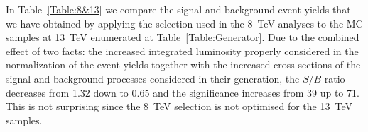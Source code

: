 

In Table~\ref{Table:8&13} we compare the signal and background event yields that we have obtained by applying the selection used in the 8~TeV analyses to the MC samples at 13~TeV enumerated at Table~\ref{Table:Generator}.
Due to the combined effect of two facts: the increased integrated luminosity
properly considered in the normalization of the event yields together with the increased cross sections of the signal and background processes considered in their generation, the $S/B$ ratio decreases from 1.32 down to 0.65 and the significance increases from 39 up to 71. This is not surprising since the 8~TeV selection is not optimised for the 13~TeV samples.


